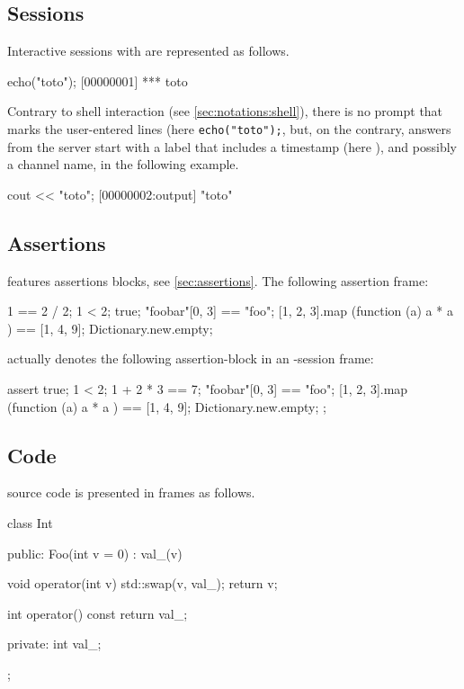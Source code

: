\subsection{\us Sessions}

Interactive sessions with \urbi are represented as follows.

\begin{urbiscript}[firstnumber=1]
echo("toto");
[00000001] *** toto
\end{urbiscript}

Contrary to shell interaction (see \autoref{sec:notations:shell}),
there is no prompt that marks the user-entered lines (here
\lstinline|echo("toto");|, but, on the contrary, answers from the \urbi
server start with a label that includes a timestamp (here
), and possibly a channel name,  in the
following example.

\begin{urbiscript}
cout << "toto";
[00000002:output] "toto"
\end{urbiscript}


\subsection{\us Assertions}

\us features assertions blocks, see \autoref{sec:assertions}.  The
following assertion frame:

\begin{urbiassert}
1 == 2 / 2;
1 < 2;
true;
"foobar"[0, 3] == "foo";
[1, 2, 3].map (function (a) { a * a }) == [1, 4, 9];
Dictionary.new.empty;
\end{urbiassert}

\noindent
actually denotes the following assertion-block in an \us-session
frame:

\begin{urbiscript}
assert
{
  true;
  1 < 2;
  1 + 2 * 3 == 7;
  "foobar"[0, 3] == "foo";
  [1, 2, 3].map (function (a) { a * a }) == [1, 4, 9];
  Dictionary.new.empty;
};
\end{urbiscript}

\subsection{\Cxx Code}

\Cxx source code is presented in frames as follows.

\begin{cxx}
class Int
{
public:
  Foo(int v = 0)
    : val_(v)
  {}

  void operator(int v)
  {
    std::swap(v, val_);
    return v;
  }

  int operator() const
  {
    return val_;
  }

private:
  int val_;
};
\end{cxx}

